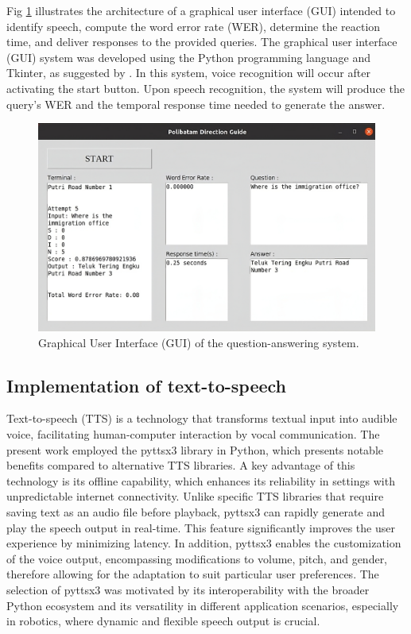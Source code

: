\documentclass{../styles/svproc}
\begin{document}
Fig \ref{fig:gui} illustrates the architecture of a graphical user interface (GUI) intended to identify speech, compute the word error rate (WER), determine the reaction time, and deliver responses to the provided queries. The graphical user interface (GUI) system was developed using the Python programming language and Tkinter, as suggested by \cite{Venkata_Naga_Nymisha2024-uw}. In this system, voice recognition will occur after activating the start button. Upon speech recognition, the system will produce the query's WER and the temporal response time needed to generate the answer.

\begin{figure}[t]
	\centering
	\includegraphics[width=1\textwidth]{./images/gui.png}
	\caption{Graphical User Interface (GUI) of the question-answering system.}
	\label{fig:gui}
\end{figure}

\subsection{Implementation of text-to-speech}
Text-to-speech (TTS) is a technology that transforms textual input into audible voice, facilitating human-computer interaction by vocal communication. The present work employed the pyttsx3 library in Python, which presents notable benefits compared to alternative TTS libraries. A key advantage of this technology is its offline capability, which enhances its reliability in settings with unpredictable internet connectivity. Unlike specific TTS libraries that require saving text as an audio file before playback, pyttsx3 can rapidly generate and play the speech output in real-time. This feature significantly improves the user experience by minimizing latency. In addition, pyttsx3 enables the customization of the voice output, encompassing modifications to volume, pitch, and gender, therefore allowing for the adaptation to suit particular user preferences. The selection of pyttsx3 was motivated by its interoperability with the broader Python ecosystem and its versatility in different application scenarios, especially in robotics, where dynamic and flexible speech output is crucial.
\end{document}
